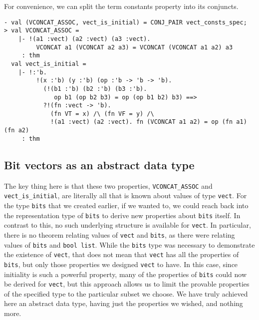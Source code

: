 For convenience, we can split the term constants property into its conjuncts.
%
\begin{session}
\begin{verbatim}
- val (VCONCAT_ASSOC, vect_is_initial) = CONJ_PAIR vect_consts_spec;
> val VCONCAT_ASSOC =
    |- !(a1 :vect) (a2 :vect) (a3 :vect).
         VCONCAT a1 (VCONCAT a2 a3) = VCONCAT (VCONCAT a1 a2) a3
     : thm
  val vect_is_initial =
    |- !:'b.
         !(x :'b) (y :'b) (op :'b -> 'b -> 'b).
           (!(b1 :'b) (b2 :'b) (b3 :'b).
              op b1 (op b2 b3) = op (op b1 b2) b3) ==>
           ?!(fn :vect -> 'b).
             (fn VT = x) /\ (fn VF = y) /\
             !(a1 :vect) (a2 :vect). fn (VCONCAT a1 a2) = op (fn a1) (fn a2)
     : thm
\end{verbatim}
\end{session}

\subsection{Bit vectors as an abstract data type}

The key thing here is that these two properties, \texttt{VCONCAT\_ASSOC}
and \texttt{vect\_is\_initial}, are literally all that is known about values
of type \texttt{vect}. For the type \texttt{bits} that we created earlier,
if we wanted to, we could reach back
into the representation type of \texttt{bits} to derive new properties
about \texttt{bits} itself.
In contrast to this,
no such underlying structure is available for \texttt{vect}.
In particular, there is no theorem relating values of \texttt{vect} and
\texttt{bits}, as there were relating values of \texttt{bits} and
\texttt{bool list}.
While the \texttt{bits} type was necessary to demonstrate the existence of
\texttt{vect}, that does not mean that \texttt{vect} has all the properties
of \texttt{bits}, but only those properties we designed \texttt{vect} to have.
In this case, since initiality is such a powerful property, many of the
properties of \texttt{bits} could now be derived for \texttt{vect},
but this approach allows us to limit the provable properties of
the specified type to the particular subset we choose.
We have truly achieved here an abstract data type, having
just the properties we wished, and nothing more.


